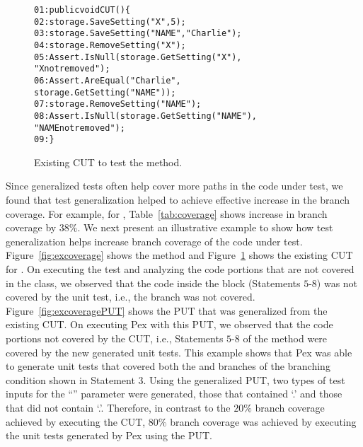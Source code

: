 \begin{figure}[t]
\begin{CodeOut}
\begin{alltt}
01: public void CUT() \{
02: \hspace*{0.07in}storage.SaveSetting("X",5);
03: \hspace*{0.07in}storage.SaveSetting("NAME","Charlie");
04: \hspace*{0.07in}storage.RemoveSetting("X");
05: \hspace*{0.07in}Assert.IsNull(storage.GetSetting("X"),
\hspace*{1.0in}"X not removed");
06: \hspace*{0.07in}Assert.AreEqual("Charlie", 
\hspace{1.0in}storage.GetSetting("NAME"));
07: \hspace*{0.07in}storage.RemoveSetting("NAME");
08: \hspace*{0.07in}Assert.IsNull(storage.GetSetting("NAME"), 
\hspace*{1.8in}"NAME not removed"); 
09: \hspace*{0.02in}\}
\end{alltt}
\end{CodeOut}  \vspace*{-3ex}
\caption{Existing CUT to test the  method.} \vspace*{-2ex}
\label{fig:excoveragetest}%
\end{figure}

Since generalized tests often help cover more paths in the code under test, we found that test generalization helped to achieve effective increase in the branch coverage. For example, for , Table~\ref{tab:coverage} shows increase in branch coverage by $38\%$. We next present an illustrative example to show how test generalization helps increase branch coverage of the code under test. Figure~\ref{fig:excoverage} shows the  method and Figure~\ref{fig:excoveragetest} shows the existing CUT for . On executing the test and analyzing the code portions that are not covered in the  class, we observed that the code inside the  block (Statements $5$-$8$) was not covered by the unit test, i.e., the  branch was not covered. Figure~\ref{fig:excoveragePUT} shows the PUT that was generalized from the existing CUT. On executing Pex with this PUT, we observed that the code portions not covered by the CUT, i.e., Statements $5$-$8$ of the  method were covered by the new generated unit tests. This example shows that Pex was able to generate unit tests that covered both the  and  branches of the branching condition shown in Statement $3$. Using the generalized PUT, two types of test inputs for the ``'' parameter were generated, those that contained `.' and those that did not contain `.'. Therefore, in contrast to the $20\%$ branch coverage achieved by executing the CUT, $80\%$ branch coverage was achieved by executing the unit tests generated by Pex using the PUT. 


